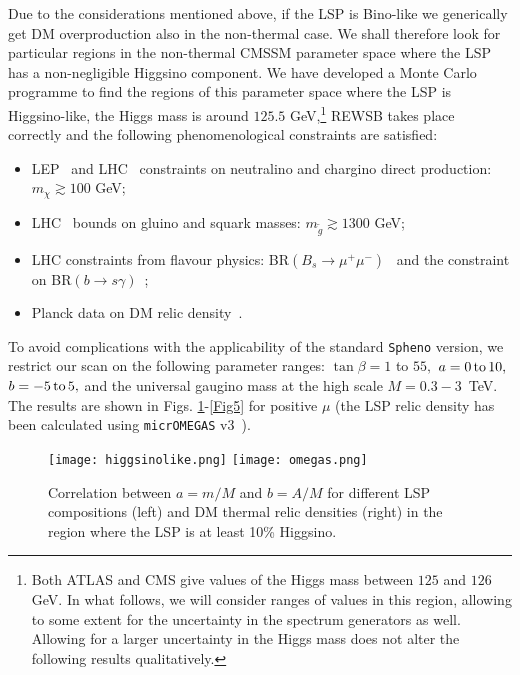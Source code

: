 \documentclass[11pt,a4paper]{article}
\newcommand{\bi}{\begin{itemize}}
\newcommand{\ei}{\end{itemize}}
\begin{document}
Due to the considerations mentioned above, if the LSP is Bino-like we generically get DM overproduction also in the non-thermal case. We shall therefore look for particular regions in the non-thermal CMSSM parameter space where the LSP has a non-negligible Higgsino component. We have developed a Monte Carlo programme to find the regions of this parameter space where the LSP is Higgsino-like, the Higgs mass is around $125.5$ GeV,\footnote{Both ATLAS and CMS give values of the Higgs mass between $125$ and $126$ GeV. In what follows,  we will consider ranges of values in this region, allowing to some extent for the uncertainty in the spectrum generators as well. Allowing for a larger uncertainty in the Higgs mass does not alter the following results qualitatively.}
REWSB takes place correctly and the following phenomenological constraints are satisfied: 
\bi
\item LEP~\cite{lep} and LHC~\cite{lhc} constraints on neutralino and chargino direct production: $m_\chi \gtrsim 100$ GeV;
\item LHC~\cite{lhc} bounds on gluino and squark masses: $m_{\tilde{g}} \gtrsim 1300$ GeV;
\item LHC constraints from flavour physics: BR$(B_s \rightarrow \mu^+ \mu^-)$~\cite{lhcb} and the constraint on BR$(b\rightarrow s\gamma)$~\cite{pdg};
\item Planck data on DM relic density~\cite{planck}.
\ei
To avoid complications with the applicability of the standard \texttt{Spheno} version, we restrict our scan on the following parameter ranges: $\tan\beta=1$ to $55,$ $a=0\,{\rm to}\,10,$ $b=-5\,{\rm to}\,5,$ and the universal gaugino mass at the high scale $M=0.3-3$~TeV. The results are shown in Figs. \ref{Fig3}-\ref{Fig5} for positive $\mu$ (the LSP relic density has been calculated using \verb"micrOMEGAS" v3~\cite{micromegas}). 

\begin{figure}[!ht]
\centering
\texttt{[image: higgsinolike.png]}
\texttt{[image: omegas.png]}
\caption{Correlation between $a=m/M$ and $b=A/M$ for different LSP compositions (left) and DM thermal relic densities (right)
in the region where the LSP is at least 10\% Higgsino.}
\label{Fig3}
\end{figure}
\end{document}
